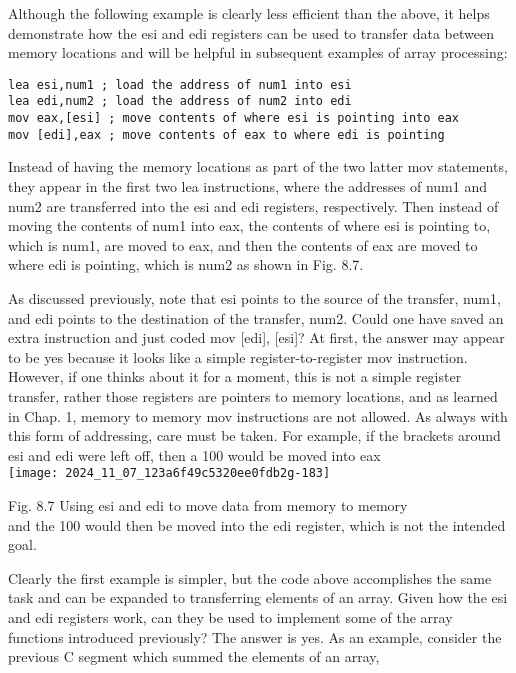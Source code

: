 \documentclass[10pt]{article}
\begin{document}
Although the following example is clearly less efficient than the above, it helps demonstrate how the esi and edi registers can be used to transfer data between memory locations and will be helpful in subsequent examples of array processing:

\begin{verbatim}
lea esi,num1 ; load the address of num1 into esi
lea edi,num2 ; load the address of num2 into edi
mov eax,[esi] ; move contents of where esi is pointing into eax
mov [edi],eax ; move contents of eax to where edi is pointing
\end{verbatim}

Instead of having the memory locations as part of the two latter mov statements, they appear in the first two lea instructions, where the addresses of num1 and num2 are transferred into the esi and edi registers, respectively. Then instead of moving the contents of num1 into eax, the contents of where esi is pointing to, which is num1, are moved to eax, and then the contents of eax are moved to where edi is pointing, which is num2 as shown in Fig. 8.7.

As discussed previously, note that esi points to the source of the transfer, num1, and edi points to the destination of the transfer, num2. Could one have saved an extra instruction and just coded mov [edi], [esi]? At first, the answer may appear to be yes because it looks like a simple register-to-register mov instruction. However, if one thinks about it for a moment, this is not a simple register transfer, rather those registers are pointers to memory locations, and as learned in Chap. 1, memory to memory mov instructions are not allowed. As always with this form of addressing, care must be taken. For example, if the brackets around esi and edi were left off, then a 100 would be moved into eax\\
\texttt{[image: 2024\_11\_07\_123a6f49c5320ee0fdb2g-183]}

Fig. 8.7 Using esi and edi to move data from memory to memory\\
and the 100 would then be moved into the edi register, which is not the intended goal.

Clearly the first example is simpler, but the code above accomplishes the same task and can be expanded to transferring elements of an array. Given how the esi and edi registers work, can they be used to implement some of the array functions introduced previously? The answer is yes. As an example, consider the previous C segment which summed the elements of an array,
\end{document}
